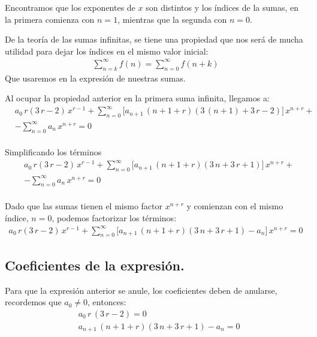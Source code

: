 Encontramos que los exponentes de $x$ son distintos y los índices de la sumas, en la primera comienza con $n = 1$, mientras que la segunda con $n = 0$.
\par
De la teoría de las sumas infinitas, se tiene una propiedad que nos será de mucha utilidad para dejar los índices en el mismo valor inicial:
\begin{align*}
\sum_{n = k}^{\infty} f(n) = \sum_{n=0}^{\infty} f(n + k)
\end{align*}
Que usaremos en la expresión de nuestras sumas.
\par
Al ocupar la propiedad anterior en la primera suma infinita, llegamos a:
\begin{align*}
&a_{0} \, r (3 \, r {-}  2) \, x^{r-1} + \sum_{n=0}^{\infty} \bigg[ a_{n+1} \, (n + 1 {+} r) (3 \, (n + 1) {+}  3 \, r {-} 2 ) \bigg] \, x^{n+r} + \\[1em]
&- \sum_{n=0}^{\infty} a_{n} \, x^{n+r} = 0
\end{align*}
\\
Simplificando los términos
\begin{align*}
&a_{0} \, r (3 \, r {-}  2) \, x^{r-1} + \sum_{n=0}^{\infty} \bigg[ a_{n+1} \, (n + 1 {+} r) (3 \, n {+}  3 \, r {+} 1 ) \bigg] \, x^{n+r} + \\[1em]
&- \sum_{n=0}^{\infty} a_{n} \, x^{n+r} = 0
\end{align*}
\\
Dado que las sumas tienen el mismo factor $x^{n+r}$ y comienzan con el mismo índice, $n = 0$, podemos factorizar los términos:
\begin{align*}
a_{0} \, r (3 \, r {-}  2) \, x^{r-1} + \sum_{n=0}^{\infty} \bigg[ a_{n+1} \, (n + 1 {+} r) (3 \, n {+}  3 \, r {+} 1 ) - a_{n} \bigg] \, x^{n+r} = 0
\end{align*}    

\subsection*{Coeficientes de la expresión.}

Para que la expresión anterior se anule, los coeficientes deben de anularse, recordemos que $a_{0} \neq 0$, entonces:
\begin{align}
&{} a_{0} \, r \, (3 \, r - 2) = 0 \label{eq:ecuacion_indices}\\[1em] 
&{} a_{n+1} \, (n + 1 {+} r) (3 \, n {+}  3 \, r {+} 1 ) - a_{n} = 0 \label{eq:ecuacion_recurrencia}
\end{align}

